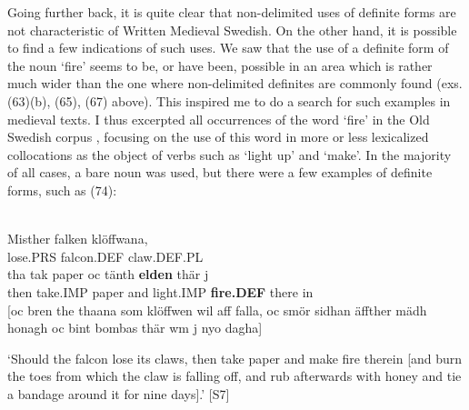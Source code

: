 Going further back, it is quite clear that non-delimited uses of definite forms are not characteristic of Written Medieval Swedish. On the other hand, it is possible to find a few indications of such uses. We saw that the use of a definite form of the noun  ‘fire’ seems to be, or have been, possible in an area which is rather much wider than the one where non-delimited definites are commonly found (exs. (63)(b), (65), (67) above). This inspired me to do a search for such examples in medieval texts. I thus excerpted all occurrences of the word  ‘fire’ in the Old Swedish corpus , focusing on the use of this word in more or less lexicalized collocations as the object of verbs such as  ‘light up’ and  ‘make’. In the majority of all cases, a bare noun was used, but there were a few examples of definite forms, such as (74):


\ea \label{} 
\\
\gll Misther  falken  klöffwana,\\
lose.PRS  falcon.DEF  claw.DEF.PL\\
\gll tha  tak  paper  oc  tänth  \textbf{elden}  thär  j\\
then  take.IMP  paper  and  light.IMP  \textbf{fire.DEF} there   in\\
[oc bren the thaana som klöffwen wil aff falla, oc smör sidhan äffther mädh honagh oc bint bombas thär wm j nyo dagha]


\glt ‘Should the falcon lose its claws, then take paper and make fire therein [and burn the toes from which the claw is falling off, and rub afterwards with honey and tie a bandage around it for nine days].’ [S7]

\z

